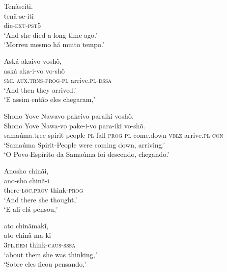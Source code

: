\documentclass[output=paper,
modfonts,nonflat
]{langsci/langscibook}
\begin{document}
\ea Tenãseiti. \\[.3em]
\gll tenã-se-iti           \\
     die-\textsc{ext-pst5} \\
\glt `And she died a long time ago.'\footnotemark \\
`Morreu mesmo há muito tempo.' \\
\z


\ea Aská akaivo voshõ, \\[.3em]
\gll aská         aka-i-vo                  vo-shõ                 \\
     \textsc{sml} \textsc{aux.trns-prog-pl} arrive.\textsc{pl-dssa} \\
\glt `And then they arrived.' \\
`E assim então eles chegaram,' \\
\z

\ea Shono Yove Nawavo pakeivo paraiki voshõ. \\[.3em]
\gll Shono        Yove   Nawa-vo            pake-i-vo             para-iki                vo-shõ.                \\
     samaúma.tree spirit people-\textsc{pl} fall-\textsc{prog-pl} come.down-\textsc{vblz} arrive.\textsc{pl-con} \\
\glt `Samaúma Spirit-People were coming down, arriving.' \\
`O Povo-Espírito da Samaúma foi descendo, chegando.' \\
\z

\newpage
\ea Anosho chinãi, \\[.3em]
\gll ano-sho                 chinã-i             \\
     there-\textsc{loc.prov} think-\textsc{prog} \\
\glt `And there she thought,' \\
`E ali elá pensou,' \\
\z

\ea ato chinãmakĩ, \\[.3em]
\gll ato              chinã-ma-kĩ              \\
     3\textsc{pl.dem} think-\textsc{caus-sssa} \\
\glt `about them she was thinking,' \\
`Sobre eles ficou pensando,' \\
\z
\end{document}
